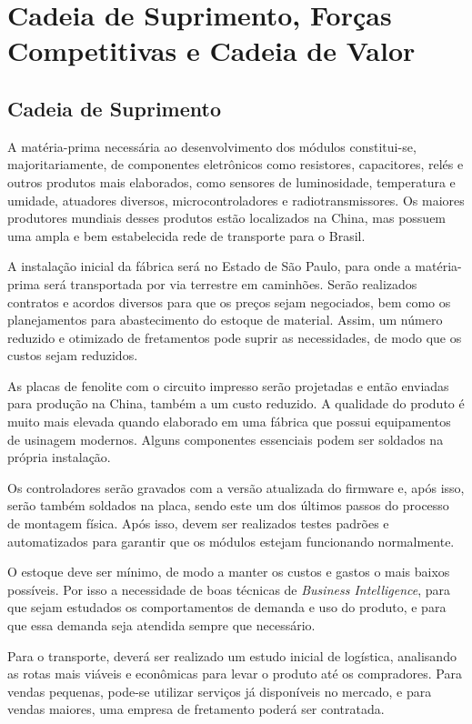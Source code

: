 \section{Cadeia de Suprimento, Forças Competitivas e Cadeia de Valor}

\subsection{Cadeia de Suprimento}

A matéria-prima necessária ao desenvolvimento dos módulos constitui-se, majoritariamente, de componentes eletrônicos como resistores, capacitores, relés e outros produtos mais elaborados, como sensores de luminosidade, temperatura e umidade, atuadores diversos, microcontroladores e radiotransmissores. Os maiores produtores mundiais desses produtos estão localizados na China, mas possuem uma ampla e bem estabelecida rede de transporte para o Brasil.

A instalação inicial da fábrica será no Estado de São Paulo, para onde a matéria-prima será transportada por via terrestre em caminhões. Serão realizados contratos e acordos diversos para que os preços sejam negociados, bem como os planejamentos para abastecimento do estoque de material. Assim, um número reduzido e otimizado de fretamentos pode suprir as necessidades, de modo que os custos sejam reduzidos.

As placas de fenolite com o circuito impresso serão projetadas e então enviadas para produção na China, também a um custo reduzido. A qualidade do produto é muito mais elevada quando elaborado em uma fábrica que possui equipamentos de usinagem modernos. Alguns componentes essenciais podem ser soldados na própria instalação.

Os controladores serão gravados com a versão atualizada do firmware e, após isso, serão também soldados na placa, sendo este um dos últimos passos do processo de montagem física. Após isso, devem ser realizados testes padrões e automatizados para garantir que os módulos estejam funcionando normalmente.

O estoque deve ser mínimo, de modo a manter os custos e gastos o mais baixos possíveis. Por isso a necessidade de boas técnicas de \emph{Business Intelligence}, para que sejam estudados os comportamentos de demanda e uso do produto, e para que essa demanda seja atendida sempre que necessário.

Para o transporte, deverá ser realizado um estudo inicial de logística, analisando as rotas mais viáveis e econômicas para levar o produto até os compradores. Para vendas pequenas, pode-se utilizar serviços já disponíveis no mercado, e para vendas maiores, uma empresa de fretamento poderá ser contratada.

